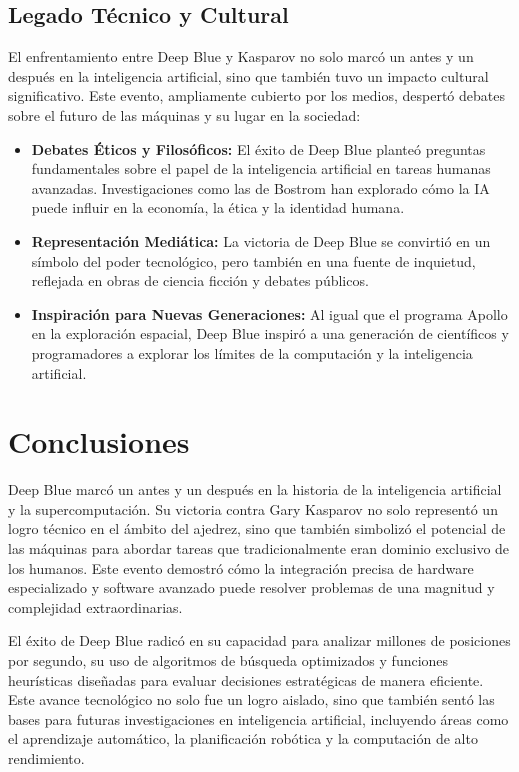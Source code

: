 \documentclass[12pt,a4paper]{article}
\begin{document}
\subsection{Legado Técnico y Cultural}

El enfrentamiento entre Deep Blue y Kasparov no solo marcó un antes y un después en la inteligencia artificial, sino que también tuvo un impacto cultural significativo. Este evento, ampliamente cubierto por los medios, despertó debates sobre el futuro de las máquinas y su lugar en la sociedad:

\begin{itemize}
    \item \textbf{Debates Éticos y Filosóficos:} El éxito de Deep Blue planteó preguntas fundamentales sobre el papel de la inteligencia artificial en tareas humanas avanzadas. Investigaciones como las de Bostrom \cite{nick2014superintelligence} han explorado cómo la IA puede influir en la economía, la ética y la identidad humana.
    \item \textbf{Representación Mediática:} La victoria de Deep Blue se convirtió en un símbolo del poder tecnológico, pero también en una fuente de inquietud, reflejada en obras de ciencia ficción y debates públicos.
    \item \textbf{Inspiración para Nuevas Generaciones:} Al igual que el programa Apollo en la exploración espacial, Deep Blue inspiró a una generación de científicos y programadores a explorar los límites de la computación y la inteligencia artificial.
\end{itemize}

\newpage

\section{Conclusiones}
Deep Blue marcó un antes y un después en la historia de la inteligencia artificial y la supercomputación. Su victoria contra Gary Kasparov no solo representó un logro técnico en el ámbito del ajedrez, sino que también simbolizó el potencial de las máquinas para abordar tareas que tradicionalmente eran dominio exclusivo de los humanos. Este evento demostró cómo la integración precisa de hardware especializado y software avanzado puede resolver problemas de una magnitud y complejidad extraordinarias.

El éxito de Deep Blue radicó en su capacidad para analizar millones de posiciones por segundo, su uso de algoritmos de búsqueda optimizados y funciones heurísticas diseñadas para evaluar decisiones estratégicas de manera eficiente. Este avance tecnológico no solo fue un logro aislado, sino que también sentó las bases para futuras investigaciones en inteligencia artificial, incluyendo áreas como el aprendizaje automático, la planificación robótica y la computación de alto rendimiento.
\end{document}
